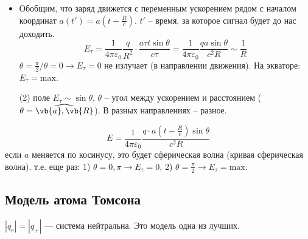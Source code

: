 \begin{itemize}
	\item Обобщим, что заряд движется с переменным ускорением рядом с началом координат $a(t') = a(t - \frac{R}{c})$.
	$t'$ -- время, за которое сигнал будет до нас доходить.
	\begin{equation*}
		E_\tau = \frac{1}{4\pi\varepsilon_0} \frac{q}{R^2} \cdot \frac{a \tau t \sin\theta}{c\tau} = \frac{1}{4\pi\varepsilon_0} \frac{q a \sin\theta}{c^2 R} \sim \frac{1}{R}
	\end{equation*}
	$\theta = \frac{\pi}{2} / \theta = 0 \to E_\tau = 0$ не излучает (в направлении движения). На экваторе: $E_\tau = \text{max}$.
	
	(2) поле $E_\tau \sim \sin\theta$, $\theta$ -- угол между ускорением и расстоянием ($\theta = \widehat{\vb{a}, \vb{R}}$). В разных направлениях -- разное.
\end{itemize}

\begin{nb}
	\begin{equation*}
		E = \frac{1}{4\pi\varepsilon_0} \frac{q \cdot a(t - \frac{R}{c}) \sin\theta}{c^2 R}
	\end{equation*}
	если $a$ меняется по косинусу, это будет сферическая волна (кривая сферическая волна).
	т.е. еще раз: 1) $\theta = 0, \pi \to E_\tau = 0$, 2) $\theta = \frac{\pi}{2} \to E_\tau = \text{max}$.
\end{nb}

\subsection{Модель атома Томсона}

$|q_e| = |q_+|$ --- система нейтральна. Это модель одна из лучших.
\begin{figure}[H]
	\centering
\end{figure}

